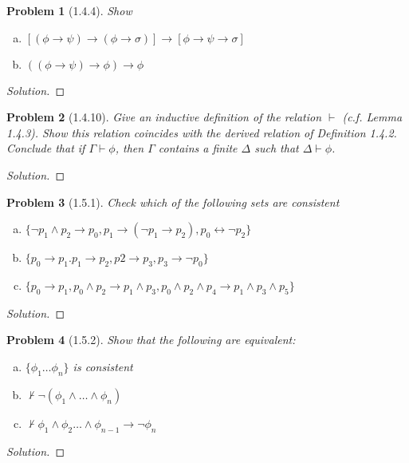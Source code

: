 \documentclass[letter]{article}
\newtheorem{problem}{Problem}
\theoremstyle{definition}
\newenvironment{solution}
{\begin{proof}[Solution]}
	{\end{proof}}
\begin{document}
\begin{problem}[1.4.4] Show
    \begin{enumerate}[(a)]
        \item $[(\phi \to \psi) \to (\phi \to \sigma)] \to [ \phi \to \psi \to \sigma]$
        \item $((\phi \to \psi) \to \phi) \to \phi$
    \end{enumerate}
\end{problem}
\begin{solution}
\end{solution}

\begin{problem}[1.4.10] Give an inductive definition of the relation $\vdash$ (c.f. Lemma 1.4.3). Show this relation coincides with the derived relation of Definition 1.4.2. Conclude that if $\Gamma \vdash \phi$, then $\Gamma$ contains a finite $\Delta$ such that $\Delta \vdash \phi$.
\end{problem}
\begin{solution}
\end{solution}


\begin{problem}[1.5.1] Check which of the following sets are consistent
    \begin{enumerate}[(a)]
        \item $\{\neg p_1 \land p_2 \to p_0, p_1 \to (\neg p_1 \to p_2), p_0 \leftrightarrow \neg p_2\}$
        \item $\{p_0 \to p_1. p_1 \to p_2, p2 \to p_3, p_3 \to \neg p_0\}$
        \item $\{p_0 \to p_1, p_0 \land p_2 \to p_1 \land p_3, p_0 \land p_2 \land p_4 \to p_1 \land p_3 \land p_5 \}$
    \end{enumerate}
\end{problem}
\begin{solution}
\end{solution}

\begin{problem}[1.5.2] Show that the following are equivalent:
    \begin{enumerate}[(a)]
        \item $\{\phi_1 \ldots \phi_n\}$ is consistent
        \item $\not \vdash \neg (\phi_1 \land \ldots \land \phi_n)$
        \item $\not \vdash \phi_1 \land \phi_2 \ldots \land \phi_{n-1}\to \neg \phi_n$
    \end{enumerate}
\end{problem}
\begin{solution}
\end{solution}
\end{document}
